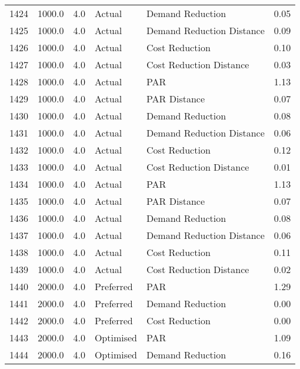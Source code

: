 \begin{longtable}{lrrllr}
1424 &       1000.0 &     4.0 &         Actual &           Demand Reduction &   0.05 \\
1425 &       1000.0 &     4.0 &         Actual &  Demand Reduction Distance &   0.09 \\
1426 &       1000.0 &     4.0 &         Actual &             Cost Reduction &   0.10 \\
1427 &       1000.0 &     4.0 &         Actual &    Cost Reduction Distance &   0.03 \\
1428 &       1000.0 &     4.0 &         Actual &                        PAR &   1.13 \\
1429 &       1000.0 &     4.0 &         Actual &               PAR Distance &   0.07 \\
1430 &       1000.0 &     4.0 &         Actual &           Demand Reduction &   0.08 \\
1431 &       1000.0 &     4.0 &         Actual &  Demand Reduction Distance &   0.06 \\
1432 &       1000.0 &     4.0 &         Actual &             Cost Reduction &   0.12 \\
1433 &       1000.0 &     4.0 &         Actual &    Cost Reduction Distance &   0.01 \\
1434 &       1000.0 &     4.0 &         Actual &                        PAR &   1.13 \\
1435 &       1000.0 &     4.0 &         Actual &               PAR Distance &   0.07 \\
1436 &       1000.0 &     4.0 &         Actual &           Demand Reduction &   0.08 \\
1437 &       1000.0 &     4.0 &         Actual &  Demand Reduction Distance &   0.06 \\
1438 &       1000.0 &     4.0 &         Actual &             Cost Reduction &   0.11 \\
1439 &       1000.0 &     4.0 &         Actual &    Cost Reduction Distance &   0.02 \\
1440 &       2000.0 &     4.0 &      Preferred &                        PAR &   1.29 \\
1441 &       2000.0 &     4.0 &      Preferred &           Demand Reduction &   0.00 \\
1442 &       2000.0 &     4.0 &      Preferred &             Cost Reduction &   0.00 \\
1443 &       2000.0 &     4.0 &      Optimised &                        PAR &   1.09 \\
1444 &       2000.0 &     4.0 &      Optimised &           Demand Reduction &   0.16 \\

\end{longtable}
